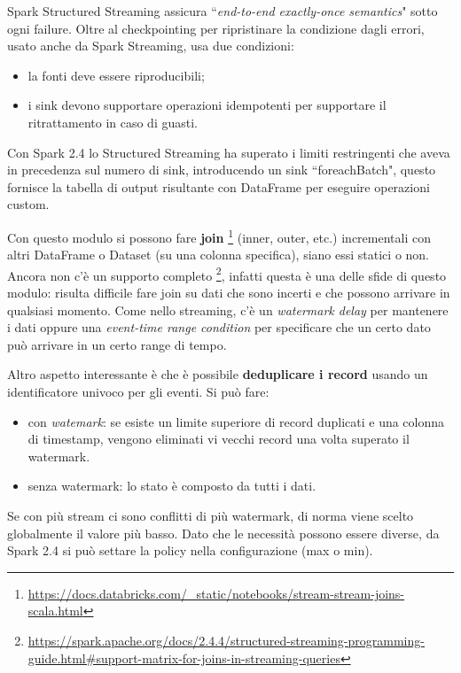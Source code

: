 \documentclass[12pt,italian]{article}
\begin{document}
\par Spark Structured Streaming assicura ``\textit{end-to-end exactly-once semantics}" sotto ogni failure.
Oltre al checkpointing per ripristinare la condizione dagli errori, usato anche da Spark Streaming, usa due condizioni:
\begin{itemize}
	\item la fonti deve essere riproducibili;
	\item i sink devono supportare operazioni idempotenti per supportare il ritrattamento in caso di guasti.
\end{itemize}
Con Spark 2.4 lo Structured Streaming ha superato i limiti restringenti che aveva in precedenza sul numero di sink, introducendo un sink ``foreachBatch", questo fornisce la tabella di output risultante con DataFrame per eseguire operazioni custom.

\par Con questo modulo si possono fare \textbf{join} \footnote{\url{https://docs.databricks.com/_static/notebooks/stream-stream-joins-scala.html}} (inner, outer, etc.) incrementali con altri DataFrame o Dataset (su una colonna specifica), siano essi statici o non.
Ancora non c'è un supporto completo \footnote{\url{https://spark.apache.org/docs/2.4.4/structured-streaming-programming-guide.html\#support-matrix-for-joins-in-streaming-queries}}, infatti questa è una delle sfide di questo modulo: risulta difficile fare join su dati che sono incerti e che possono arrivare in qualsiasi momento. Come nello streaming, c'è un \textit{watermark delay} per mantenere i dati oppure una \textit{event-time range condition} per specificare che un certo dato può arrivare in un certo range di tempo.

\par Altro aspetto interessante è che è possibile \textbf{deduplicare i record} usando un identificatore univoco per gli eventi. Si può fare:
\begin{itemize}
	\item con \textit{watemark}: se esiste un limite superiore di record duplicati e una colonna di timestamp, vengono eliminati vi vecchi record una volta superato il watermark.
	\item senza watermark: lo stato è composto da tutti i dati.
\end{itemize}
Se con più stream ci sono conflitti di più watermark, di norma viene scelto globalmente il valore più basso. Dato che le necessità possono essere diverse, da Spark 2.4 si può
settare la policy nella configurazione (max o min).
\end{document}
